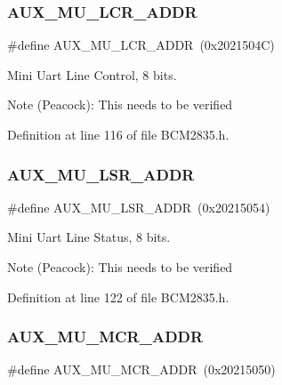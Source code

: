 \subsubsection{\texorpdfstring{A\+U\+X\+\_\+\+M\+U\+\_\+\+L\+C\+R\+\_\+\+A\+D\+DR}{AUX\_MU\_LCR\_ADDR}}
{\footnotesize\ttfamily \#define A\+U\+X\+\_\+\+M\+U\+\_\+\+L\+C\+R\+\_\+\+A\+D\+DR~(0x2021504\+C)}



Mini Uart Line Control, 8 bits. 

\begin{DoxyNote}{Note}
(Peacock)\+: This needs to be verified 
\end{DoxyNote}


Definition at line 116 of file B\+C\+M2835.\+h.

\mbox{\label{group__UART_ga118983fa3b92ba87e7d341722fa0bc31}} 
\subsubsection{\texorpdfstring{A\+U\+X\+\_\+\+M\+U\+\_\+\+L\+S\+R\+\_\+\+A\+D\+DR}{AUX\_MU\_LSR\_ADDR}}
{\footnotesize\ttfamily \#define A\+U\+X\+\_\+\+M\+U\+\_\+\+L\+S\+R\+\_\+\+A\+D\+DR~(0x20215054)}



Mini Uart Line Status, 8 bits. 

\begin{DoxyNote}{Note}
(Peacock)\+: This needs to be verified 
\end{DoxyNote}


Definition at line 122 of file B\+C\+M2835.\+h.

\mbox{\label{group__UART_ga76017c2dd6557c4d387828112f1335fe}} 
\subsubsection{\texorpdfstring{A\+U\+X\+\_\+\+M\+U\+\_\+\+M\+C\+R\+\_\+\+A\+D\+DR}{AUX\_MU\_MCR\_ADDR}}
{\footnotesize\ttfamily \#define A\+U\+X\+\_\+\+M\+U\+\_\+\+M\+C\+R\+\_\+\+A\+D\+DR~(0x20215050)}



